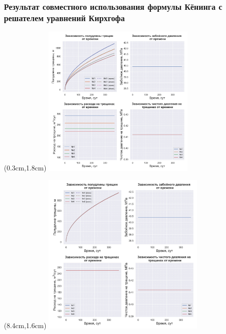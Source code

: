\documentclass{beamer}
\begin{document}
\begin{frame}
\frametitle{Результат совместного использования формулы Кёнинга с решателем уравнений Кирхгофа}

\begin{textblock*}{7.5cm}(0.3cm,1.8cm)
\includegraphics[width=7.5cm]{myimage1.jpg}
\end{textblock*}

\begin{textblock*}{8cm}(8.4cm,1.6cm)
%
  {\includegraphics[width=8cm]{myimage14.jpg}}
\end{textblock*}

\end{frame}
\end{document}
